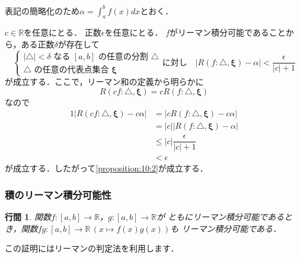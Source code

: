 \documentclass{jsarticle}
\makeatletter
\renewenvironment{proof}[1][\proofname]{\par
        \pushQED{\qed}
        \normalfont
        \topsep6\p@\@plus6\p@ \trivlist
        \item[\hskip\labelsep{\bfseries #1}\@addpunct{\bfseries}]\ignorespaces
    }{%
        \popQED\endtrivlist\@endpefalse
    }
\renewcommand{\proofname}{\underline{証明.}}
\newtheorem{proposition}{行間}
\makeatother
\begin{document}
\begin{proof}
    表記の簡略化のため$\alpha = \int_a^b f(x) dx$とおく．

    $c \in \mathbb{R}$を任意にとる．
    正数$\epsilon$を任意にとる．
    $f$がリーマン積分可能であることから，ある正数$\delta$が存在して
    \begin{equation}
        \nonumber
        \begin{cases}
            |\triangle| < \delta \mbox{ なる } [a, b] \mbox{ の任意の分割 } \triangle \\
            \triangle \mbox{ の任意の代表点集合 } \mathbf{\xi}
        \end{cases}
        \mbox{に対し} \quad
        |R(f: \triangle, \mathbf{\xi}) - \alpha| < \dfrac{\epsilon}{|c| + 1}
    \end{equation}
    が成立する．ここで，リーマン和の定義から明らかに
    \begin{equation}
        R(cf: \triangle, \mathbf{\xi}) = cR(f: \triangle, \mathbf{\xi})
    \end{equation}
    なので
    \begin{alignat}{1}
        |R(cf: \triangle, \mathbf{\xi}) - c\alpha|
            &= |cR(f: \triangle, \mathbf{\xi}) - c\alpha| \\
            &= |c||R(f: \triangle, \mathbf{\xi}) - \alpha| \\
            &\leq |c| \dfrac{\epsilon}{|c| + 1} \\
            &< \epsilon
    \end{alignat}
    が成立する．したがって\cref{proposition:10:2}が成立する．
\end{proof}

\subsubsection{積のリーマン積分可能性}

\begin{screen}
    \begin{proposition}
        関数$f:[a,b] \rightarrow \mathbb{R}$，$g:[a,b] \rightarrow \mathbb{R}$が
        ともにリーマン積分可能であるとき，関数$fg:[a,b] \rightarrow \mathbb{R}\,(x \mapsto f(x)g(x))$も
        リーマン積分可能である．
    \end{proposition}
\end{screen}

この証明にはリーマンの判定法を利用します．
\end{document}
